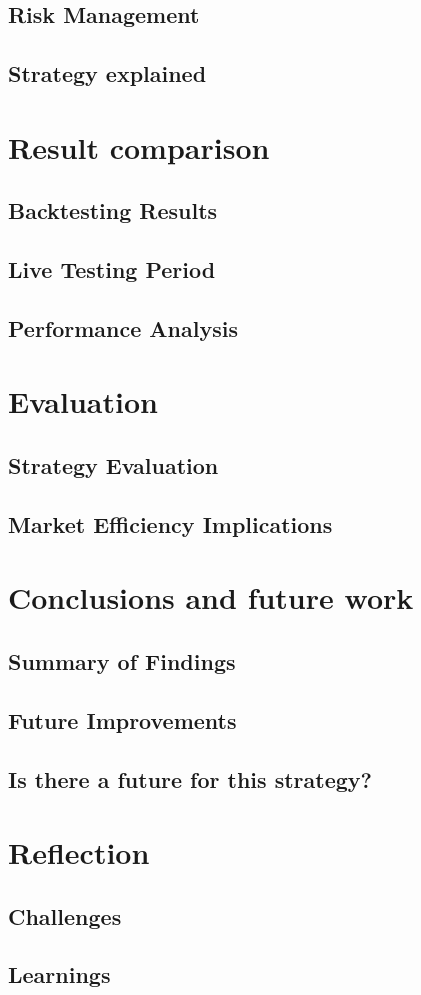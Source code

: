 \documentclass{article}
\begin{document}
\subsection{Risk Management}
\subsection{Strategy explained}

\section{Result comparison}
\subsection{Backtesting Results}
\subsection{Live Testing Period}
\subsection{Performance Analysis}

\section{Evaluation}
\subsection{Strategy Evaluation}
\subsection{Market Efficiency Implications}

\section{Conclusions and future work}
\subsection{Summary of Findings}
\subsection{Future Improvements}
\subsection{Is there a future for this strategy?}

\section{Reflection}
\subsection{Challenges}
\subsection{Learnings}


\renewcommand{\cftdot}{.}
\renewcommand{\cftdotsep}{2}

\end{document}

